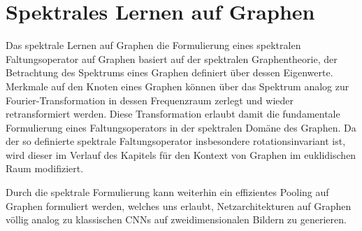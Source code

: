 \chapter{Spektrales Lernen auf Graphen}
\label{spektrales_lernen}

Das spektrale Lernen auf Graphen \bzw{} die Formulierung eines spektralen Faltungsoperator auf Graphen basiert auf der spektralen Graphentheorie, \dhe{} der Betrachtung des Spektrums eines Graphen definiert über dessen Eigenwerte.
Merkmale auf den Knoten eines Graphen können über das Spektrum analog zur Fourier-Transformation in dessen Frequenzraum zerlegt und wieder retransformiert werden.
Diese Transformation erlaubt damit die fundamentale Formulierung eines Faltungsoperators in der spektralen Domäne des Graphen.
Da der so definierte spektrale Faltungsoperator insbesondere rotationsinvariant ist, wird dieser im Verlauf des Kapitels für den Kontext von Graphen im euklidischen Raum modifiziert.

Durch die spektrale Formulierung kann weiterhin ein effizientes Pooling auf Graphen formuliert werden, welches uns erlaubt, Netzarchitekturen auf Graphen völlig analog zu klassischen \glspl{CNN} auf zweidimensionalen Bildern zu generieren.







